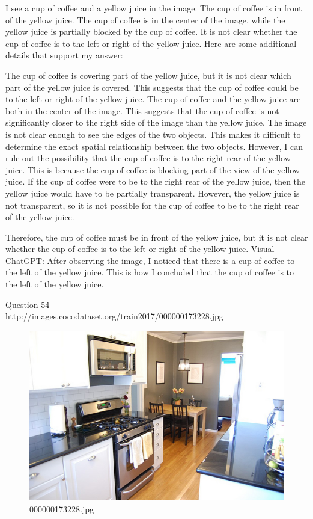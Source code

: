 \begin{enumerate}
    I see a cup of coffee and a yellow juice in the image.
    The cup of coffee is in front of the yellow juice.
    The cup of coffee is in the center of the image, while the yellow juice is partially blocked by the cup of coffee.
    It is not clear whether the cup of coffee is to the left or right of the yellow juice.
    Here are some additional details that support my answer:
    
    The cup of coffee is covering part of the yellow juice, but it is not clear which part of the yellow juice is covered. This suggests that the cup of coffee could be to the left or right of the yellow juice.
    The cup of coffee and the yellow juice are both in the center of the image. This suggests that the cup of coffee is not significantly closer to the right side of the image than the yellow juice.
    The image is not clear enough to see the edges of the two objects. This makes it difficult to determine the exact spatial relationship between the two objects.
    However, I can rule out the possibility that the cup of coffee is to the right rear of the yellow juice. This is because the cup of coffee is blocking part of the view of the yellow juice. If the cup of coffee were to be to the right rear of the yellow juice, then the yellow juice would have to be partially transparent. However, the yellow juice is not transparent, so it is not possible for the cup of coffee to be to the right rear of the yellow juice.
    
    Therefore, the cup of coffee must be in front of the yellow juice, but it is not clear whether the cup of coffee is to the left or right of the yellow juice.
    \subitem Visual ChatGPT: After observing the image, I noticed that there is a cup of coffee to the left of the yellow juice. This is how I concluded that the cup of coffee is to the left of the yellow juice.
\end{enumerate}
Question 54\\
http://images.cocodataset.org/train2017/000000173228.jpg
\begin{figure}[h]
    \centering
    \includegraphics[width=0.8\linewidth]{../image set/hard/000000173228.jpg}
    \caption{000000173228.jpg}
\end{figure}
